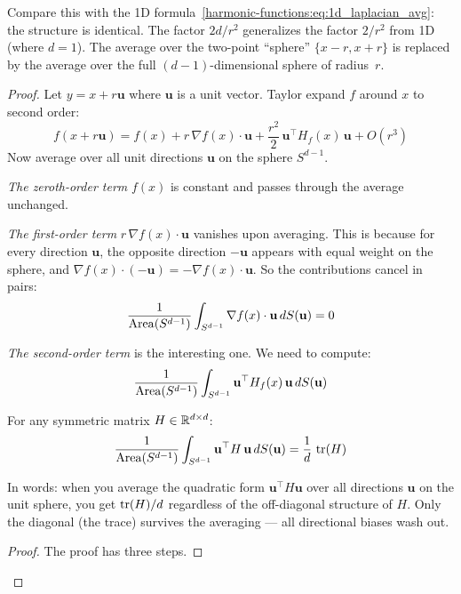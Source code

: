 \begin{notechapter}
Compare this with the 1D formula~\eqref{harmonic-functions:eq:1d_laplacian_avg}: the structure
is identical. The factor $2d/r^2$ generalizes the factor $2/r^2$ from 1D
(where $d = 1$). The average over the two-point ``sphere'' $\{x-r, x+r\}$
is replaced by the average over the full $(d-1)$-dimensional sphere of
radius~$r$.

\begin{proof}
Let $y = x + r\mathbf{u}$ where $\mathbf{u}$ is a unit vector. Taylor expand
$f$ around $x$ to second order:
\begin{equation}
f(x + r\mathbf{u}) = f(x) + r\,\nabla f(x) \cdot \mathbf{u}
  + \frac{r^2}{2}\,\mathbf{u}^\top H_f(x)\,\mathbf{u} + O(r^3)
\end{equation}
Now average over all unit directions $\mathbf{u}$ on the sphere $S^{d-1}$.

\emph{The zeroth-order term} $f(x)$ is constant and passes through the
average unchanged.

\emph{The first-order term} $r\,\nabla f(x) \cdot \mathbf{u}$ vanishes
upon averaging. This is because for every direction $\mathbf{u}$, the
opposite direction $-\mathbf{u}$ appears with equal weight on the sphere,
and $\nabla f(x) \cdot (-\mathbf{u}) = -\nabla f(x) \cdot \mathbf{u}$. So
the contributions cancel in pairs:
\[
\frac{1}{\operatorname{Area}(S^{d-1})} \int_{S^{d-1}}
  \nabla f(x) \cdot \mathbf{u}\,dS(\mathbf{u}) = 0
\]

\emph{The second-order term} is the interesting one. We need to compute:
\[
\frac{1}{\operatorname{Area}(S^{d-1})} \int_{S^{d-1}}
  \mathbf{u}^\top H_f(x)\,\mathbf{u}\,dS(\mathbf{u})
\]

\begin{lemma}
\label{harmonic-functions:lem:sphere_average_quadratic}
For any symmetric matrix $H \in \mathbb{R}^{d \times d}$:
\begin{equation}
\frac{1}{\operatorname{Area}(S^{d-1})} \int_{S^{d-1}}
  \mathbf{u}^\top H\,\mathbf{u}\,dS(\mathbf{u}) = \frac{1}{d}\,\operatorname{tr}(H)
\end{equation}
\end{lemma}

In words: when you average the quadratic form $\mathbf{u}^\top H\mathbf{u}$
over all directions $\mathbf{u}$ on the unit sphere, you get $\operatorname{tr}(H)/d$
regardless of the off-diagonal structure of $H$. Only the diagonal (the
trace) survives the averaging --- all directional biases wash out.

\begin{proof}
The proof has three steps.


\end{proof}
\end{proof}
\end{notechapter}
